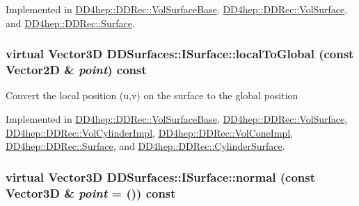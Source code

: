 Implemented in \hyperlink{class_d_d4hep_1_1_d_d_rec_1_1_vol_surface_base_a28732fc0788f9f53c3811303b852b470}{DD4hep::DDRec::VolSurfaceBase}, \hyperlink{class_d_d4hep_1_1_d_d_rec_1_1_vol_surface_acf14d37efeb8c9baaeba295f9e0fa38f}{DD4hep::DDRec::VolSurface}, and \hyperlink{class_d_d4hep_1_1_d_d_rec_1_1_surface_a7c24c48062ae82692d31af6430b52ec6}{DD4hep::DDRec::Surface}.\hypertarget{class_d_d_surfaces_1_1_i_surface_a39651d79f7969ac7402a6e2cfc37803c}{
\subsubsection[{localToGlobal}]{\setlength{\rightskip}{0pt plus 5cm}virtual {\bf Vector3D} DDSurfaces::ISurface::localToGlobal (const {\bf Vector2D} \& {\em point}) const}}
\label{class_d_d_surfaces_1_1_i_surface_a39651d79f7969ac7402a6e2cfc37803c}
Convert the local position (u,v) on the surface to the global position 

Implemented in \hyperlink{class_d_d4hep_1_1_d_d_rec_1_1_vol_surface_base_a62f5625f6f620535765193e97990fb1d}{DD4hep::DDRec::VolSurfaceBase}, \hyperlink{class_d_d4hep_1_1_d_d_rec_1_1_vol_surface_a784a48baa6fa269f2c626acce19f1154}{DD4hep::DDRec::VolSurface}, \hyperlink{class_d_d4hep_1_1_d_d_rec_1_1_vol_cylinder_impl_ae0918a43a874b96dc2f55506d4f509a2}{DD4hep::DDRec::VolCylinderImpl}, \hyperlink{class_d_d4hep_1_1_d_d_rec_1_1_vol_cone_impl_a1428d72f28ed90522cdaa6bb4d855dce}{DD4hep::DDRec::VolConeImpl}, \hyperlink{class_d_d4hep_1_1_d_d_rec_1_1_surface_ad5107e6eed2e092460a69530258b4852}{DD4hep::DDRec::Surface}, and \hyperlink{class_d_d4hep_1_1_d_d_rec_1_1_cylinder_surface_a175adc46f395f0795e4aad32147516fa}{DD4hep::DDRec::CylinderSurface}.\hypertarget{class_d_d_surfaces_1_1_i_surface_abbead4b1af2864d6d3f61270543310a0}{
\subsubsection[{normal}]{\setlength{\rightskip}{0pt plus 5cm}virtual {\bf Vector3D} DDSurfaces::ISurface::normal (const {\bf Vector3D} \& {\em point} = {()}) const}}
\label{class_d_d_surfaces_1_1_i_surface_abbead4b1af2864d6d3f61270543310a0}


